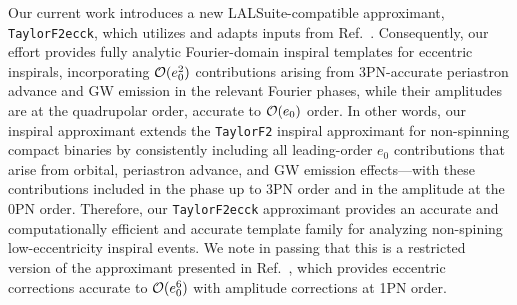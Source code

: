 \documentclass[aps,prd,twocolumn,superscriptaddress,groupedaddress,nofootinbib,showpacs,eqsecnum,useAms]{revtex4-2}
\begin{document}
Our current work introduces a new LALSuite-compatible approximant, \texttt{TaylorF2ecck}, which utilizes and adapts inputs from Ref.~\cite{TGHH}. Consequently, our effort provides fully analytic Fourier-domain inspiral templates for eccentric inspirals, incorporating ${\cal O}(e_0^2)$ contributions arising from 3PN-accurate periastron advance and GW emission in the relevant Fourier phases, while their amplitudes are at the quadrupolar order, accurate to ${\cal O}(e_0)$ order.
In other words, our inspiral approximant extends the \texttt{TaylorF2} inspiral approximant for non-spinning compact binaries by consistently including all leading-order $e_0$ contributions that arise from orbital, periastron advance, and GW emission effects—with these contributions included in the phase up to 3PN order and in the amplitude at the 0PN order.
Therefore, our \texttt{TaylorF2ecck} approximant provides an accurate and computationally efficient and accurate template family for analyzing non-spining low-eccentricity inspiral events.
We note in passing that this is a 
restricted version of the approximant presented in Ref.~\cite{TGHH}, which provides eccentric corrections accurate to ${\cal O}(e_0^6)$ with amplitude corrections at 1PN order. 


\end{document}
